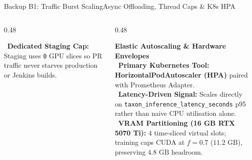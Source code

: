 \documentclass[aspectratio=169,10pt]{beamer}
\begin{document}
\begin{frame}{Backup B1: Traffic Burst Scaling}{Async Offloading, Thread Caps \& K8s HPA}
\begin{columns}[T]
\begin{column}{0.48\textwidth}
\begin{bluecard}
                \textbullet\ \textbf{Dedicated Staging Cap:} Staging uses \texttt{0} GPU slices so PR traffic never starves production or Jenkins builds.
            \end{bluecard}
        \end{column}
        \begin{column}{0.48\textwidth}
            \begin{greencard}
                \raggedright
                \textbf{\color{GreenAccent} Elastic Autoscaling \& Hardware Envelopes}\\[3pt]
                \textbullet\ \textbf{Primary Kubernetes Tool:} \textbf{HorizontalPodAutoscaler (HPA)} paired with Prometheus Adapter.\\[2pt]
                \textbullet\ \textbf{Latency-Driven Signal:} Scales directly on \texttt{taxon\_inference\_latency\_seconds} p95 rather than naive CPU utilisation alone.\\[2pt]
                \textbullet\ \textbf{VRAM Partitioning (16 GB RTX 5070 Ti):} 4 time-sliced virtual slots; training caps CUDA at $f=0.7$ ($11.2\text{ GB}$), preserving $4.8\text{ GB}$ headroom.
            \end{greencard}
        \end{column}
    \end{columns}


\end{frame}
\end{document}
